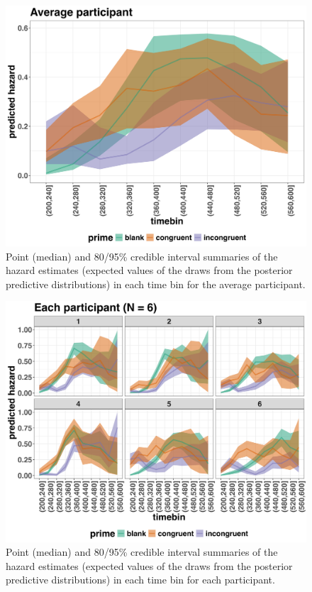 \documentclass[
  man, donotrepeattitle,floatsintext]{apa6}
\begin{document}
\begin{figure}[H]

{\centering \includegraphics[width=0.8\linewidth,height=0.67\textheight,]{../Tutorial_2_Bayesian/figures/M1i_pred_grand} 

}

\caption{Point (median) and 80/95\% credible interval summaries of the hazard estimates (expected values of the draws from the posterior predictive distributions) in each time bin for the average participant.}\label{fig:plot-pred-grand-effects}
\end{figure}



\begin{figure}[H]

{\centering \includegraphics[width=0.8\linewidth,height=0.67\textheight,]{../Tutorial_2_Bayesian/figures/M1i_pred_pid} 

}

\caption{Point (median) and 80/95\% credible interval summaries of the hazard estimates (expected values of the draws from the posterior predictive distributions) in each time bin for each participant.}\label{fig:plot-pred-pid-effects}
\end{figure}
\end{document}
